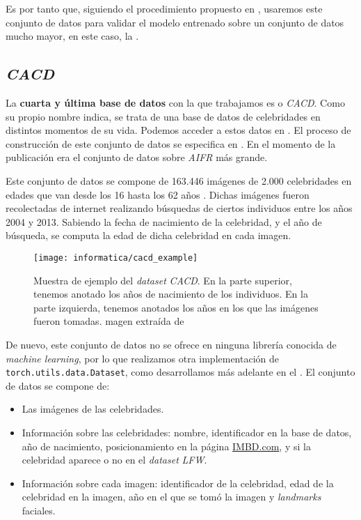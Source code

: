 Es por tanto que, siguiendo el procedimiento propuesto en \cite{informatica:best_fgnet_model}, usaremos este conjunto de datos para validar el modelo entrenado sobre un conjunto de datos mucho mayor, en este caso, la .

\subsection{\textit{CACD}} \label{isec:dataset_cacd}

La \textbf{cuarta y última base de datos} con la que trabajamos es  o \textit{CACD}. Como su propio nombre indica, se trata de una base de datos de celebridades en distintos momentos de su vida. Podemos acceder a estos datos en \cite{informatica:cacd_dataset}. El proceso de construcción de este conjunto de datos se especifica en \cite{informatica:paper_cacd}. En el momento de la publicación era el conjunto de datos sobre \textit{AIFR} más grande.

Este conjunto de datos se compone de 163.446 imágenes de 2.000 celebridades en edades que van desde los 16 hasta los 62 años \cite{informatica:paper_cacd}. Dichas imágenes fueron recolectadas de internet realizando búsquedas de ciertos individuos entre los años 2004 y 2013. Sabiendo la fecha de nacimiento de la celebridad, y el año de búsqueda, se computa la edad de dicha celebridad en cada imagen.

\begin{figure}[!h]
    \centering
    \texttt{[image: informatica/cacd\_example]}
    \caption{Muestra de ejemplo del \textit{dataset} \textit{CACD}. En la parte superior, tenemos anotado los años de nacimiento de los individuos. En la parte izquierda, tenemos anotados los años en los que las imágenes fueron tomadas. magen extraída de \cite{informatica:paper_cacd}}
    \label{img:cacd_imagenes_ejemplo}
\end{figure}

De nuevo, este conjunto de datos no se ofrece en ninguna librería conocida de \textit{machine learning}, por lo que realizamos otra implementación de \lstinline{torch.utils.data.Dataset}, como desarrollamos más adelante en el . El conjunto de datos se compone de:

\begin{itemize}
    \item Las imágenes de las celebridades.
    \item Información sobre las celebridades: nombre, identificador en la base de datos, año de nacimiento, posicionamiento en la página \url{IMBD.com}, y si la celebridad aparece o no en el \textit{dataset} \textit{LFW}.
    \item Información sobre cada imagen: identificador de la celebridad, edad de la celebridad en la imagen, año en el que se tomó la imagen y \textit{landmarks} faciales.
\end{itemize}

